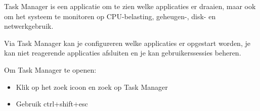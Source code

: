 Task Manager is een applicatie om te zien welke applicaties er draaien, maar ook om het systeem te monitoren op CPU-belasting, geheugen-, disk- en netwerkgebruik.

Via Task Manager kan je configureren welke applicaties er opgestart worden, je kan niet reagerende applicaties afsluiten en je kan gebruikerssessies beheren.

Om Task Manager te openen:
\begin{itemize}
\item Klik op het zoek icoon en zoek op Task Manager
\item Gebruik ctrl+shift+esc
\end{itemize}

\begin{minipage}[t]{\linewidth}
\raggedright
{}
\end{minipage}

